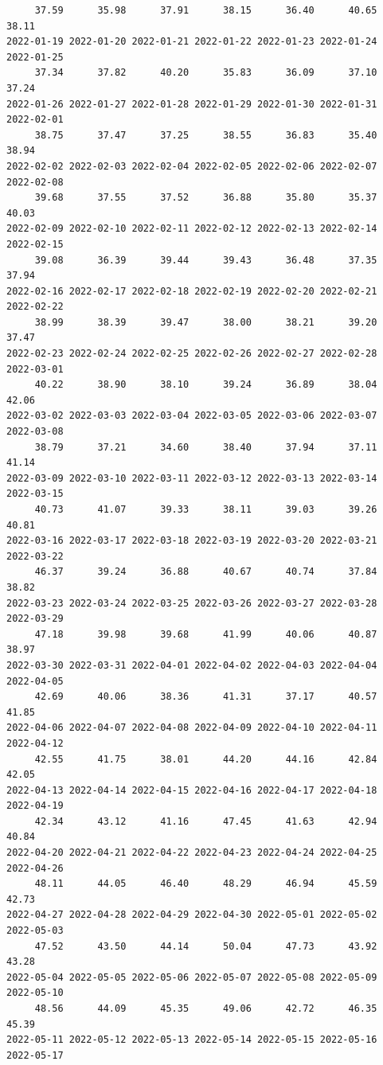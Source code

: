 \documentclass[
  letterpaper,
  DIV=11,
  numbers=noendperiod]{scrartcl}
\begin{document}
\begin{verbatim}
     37.59      35.98      37.91      38.15      36.40      40.65      38.11 
2022-01-19 2022-01-20 2022-01-21 2022-01-22 2022-01-23 2022-01-24 2022-01-25 
     37.34      37.82      40.20      35.83      36.09      37.10      37.24 
2022-01-26 2022-01-27 2022-01-28 2022-01-29 2022-01-30 2022-01-31 2022-02-01 
     38.75      37.47      37.25      38.55      36.83      35.40      38.94 
2022-02-02 2022-02-03 2022-02-04 2022-02-05 2022-02-06 2022-02-07 2022-02-08 
     39.68      37.55      37.52      36.88      35.80      35.37      40.03 
2022-02-09 2022-02-10 2022-02-11 2022-02-12 2022-02-13 2022-02-14 2022-02-15 
     39.08      36.39      39.44      39.43      36.48      37.35      37.94 
2022-02-16 2022-02-17 2022-02-18 2022-02-19 2022-02-20 2022-02-21 2022-02-22 
     38.99      38.39      39.47      38.00      38.21      39.20      37.47 
2022-02-23 2022-02-24 2022-02-25 2022-02-26 2022-02-27 2022-02-28 2022-03-01 
     40.22      38.90      38.10      39.24      36.89      38.04      42.06 
2022-03-02 2022-03-03 2022-03-04 2022-03-05 2022-03-06 2022-03-07 2022-03-08 
     38.79      37.21      34.60      38.40      37.94      37.11      41.14 
2022-03-09 2022-03-10 2022-03-11 2022-03-12 2022-03-13 2022-03-14 2022-03-15 
     40.73      41.07      39.33      38.11      39.03      39.26      40.81 
2022-03-16 2022-03-17 2022-03-18 2022-03-19 2022-03-20 2022-03-21 2022-03-22 
     46.37      39.24      36.88      40.67      40.74      37.84      38.82 
2022-03-23 2022-03-24 2022-03-25 2022-03-26 2022-03-27 2022-03-28 2022-03-29 
     47.18      39.98      39.68      41.99      40.06      40.87      38.97 
2022-03-30 2022-03-31 2022-04-01 2022-04-02 2022-04-03 2022-04-04 2022-04-05 
     42.69      40.06      38.36      41.31      37.17      40.57      41.85 
2022-04-06 2022-04-07 2022-04-08 2022-04-09 2022-04-10 2022-04-11 2022-04-12 
     42.55      41.75      38.01      44.20      44.16      42.84      42.05 
2022-04-13 2022-04-14 2022-04-15 2022-04-16 2022-04-17 2022-04-18 2022-04-19 
     42.34      43.12      41.16      47.45      41.63      42.94      40.84 
2022-04-20 2022-04-21 2022-04-22 2022-04-23 2022-04-24 2022-04-25 2022-04-26 
     48.11      44.05      46.40      48.29      46.94      45.59      42.73 
2022-04-27 2022-04-28 2022-04-29 2022-04-30 2022-05-01 2022-05-02 2022-05-03 
     47.52      43.50      44.14      50.04      47.73      43.92      43.28 
2022-05-04 2022-05-05 2022-05-06 2022-05-07 2022-05-08 2022-05-09 2022-05-10 
     48.56      44.09      45.35      49.06      42.72      46.35      45.39 
2022-05-11 2022-05-12 2022-05-13 2022-05-14 2022-05-15 2022-05-16 2022-05-17 

\end{verbatim}
\end{document}
